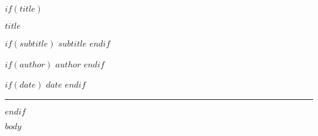 \documentclass[12pt,a4paper]{article}
\begin{document}
$if(title)$
\begin{center}
{\Huge\textcolor{hauptblau}{\textbf{$title$}}}
\vspace{0.5cm}

$if(subtitle)$
{\Large\textcolor{dunkelblau}{$subtitle$}}
\vspace{0.3cm}
$endif$

$if(author)$
{\large\textcolor{grau}{$author$}}
\vspace{0.2cm}
$endif$

$if(date)$
{\normalsize\textcolor{grau}{$date$}}
$endif$
\end{center}

\vspace{1.5cm}
\noindent\textcolor{hauptblau}{\rule{\linewidth}{1pt}}
\vspace{1cm}
$endif$

$body$
\end{document}
